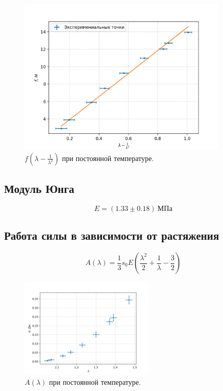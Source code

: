 \documentclass[a4paper,12pt]{article} %
\begin{document}
\begin{figure}[h!]
\begin{center}
\includegraphics[width=0.89\textwidth]{f(lambda2).png}
\caption{$f(\lambda - \frac{1}{\lambda^2})$ при постоянной температуре.}
\end{center}
\end{figure}

\FloatBarrier

\subsection*{Модуль Юнга}

\begin{equation}\label{young}
    E = (1.33 \pm 0.18) \ МПа
\end{equation}

\subsection*{Работа силы в зависимости от растяжения}

$$A(\lambda) = \frac{1}{3}s_0E(\frac{\lambda^2}{2}+\frac{1}{\lambda}-\frac{3}{2})$$

\begin{figure}[h!]
\begin{center}
\includegraphics[width=0.57\textwidth]{A(lambda).png}
\caption{$A(\lambda)$ при постоянной температуре.}\label{work}
\end{center}
\end{figure}
\end{document}
